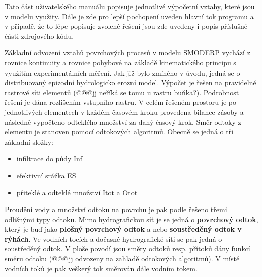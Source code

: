 %

Tato část uživatelského manuálu popisuje jednotlivé výpočetní vztahy, které jsou v modelu využity. Dále je zde pro lepší pochopení uveden hlavní tok programu a v případě, že to lépe popisuje zvolené řešení jsou zde uvedeny i popis příslušné části zdrojového kódu.

Základní odvození vztahů povrchových procesů v modelu SMODERP vychází z rovnice kontinuity a rovnice pohybové na základě kinematického principu s využitím experimentálních měření.
Jak již bylo zmíněno v úvodu, jedná se o distribuovaný epizodní hydrologicko erozní model. Výpočet je řešen na pravidelné rastrové síti elementů (@@@jj neříká se tomu u rastru buňka?). Podrobnost řešení je dána rozlišením vstupního rastru. V celém řešeném prostoru je po jednotlivých elementech v každém časovém kroku provedena bilance zásoby a následně vypočteno odteklého množství za daný časový krok. Směr odtoky z elementu je stanoven pomocí odtokových algoritmů. Obecně se jedná o tři základní složky:



\begin{itemize}\itemsep 0cm
\item infiltrace do půdy \acs{Inf}
\item efektivní srážka \acs{ES}
\item přiteklé a odteklé množství \acs{Itot} a \acs{Otot}
\end{itemize}

Proudění vody a množství odtoku na povrchu je pak podle řešeno třemi odlišnými typy odtoku. Mimo hydrografickou síť je se jedná o \textbf{povrchový odtok}, který je buď jako \textbf{plošný povrchový odtok} a nebo \textbf{soustředěný odtok v rýhách}. Ve vodních tocích a dočasné hydrografické síti se pak jedná o soustředěný odtok. V ploše povodí jsou směry odtoků resp. přítoků dány funkcí směru odtoku (@@@jj odvozeny na zahladě odtokových algoritmů). V místě vodních toků je pak veškerý tok směrován dále vodním tokem.




\newpage



